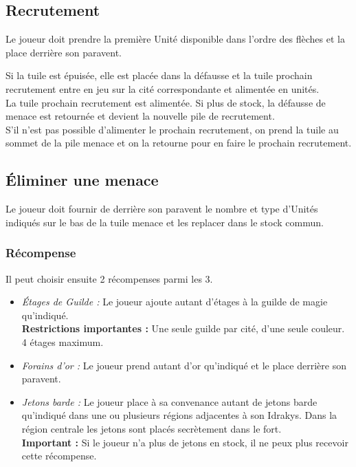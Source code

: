 \documentclass[10pt, a4paper]{article}	%
\begin{document}
\begin{multicols}{3}
\subsection{Recrutement} %
\label{sub:recrutement}
Le joueur doit prendre la première Unité disponible dans l'ordre des flèches et la place derrière son paravent.

Si la tuile est épuisée, elle est placée dans la défausse et la tuile \og{}prochain recrutement\fg{} entre en jeu sur la cité correspondante et alimentée en unités.\\
La tuile \og{}prochain recrutement\fg{} est alimentée. Si plus de stock, la défausse de menace est retournée et devient la nouvelle pile de recrutement.\\
S'il n'est pas possible d'alimenter le prochain recrutement, on prend la tuile au sommet de la pile menace et on la retourne pour en faire le prochain recrutement.

\subsection{Éliminer une menace} %
\label{sub:eliminer_une_menace}
Le joueur doit fournir de derrière son paravent le nombre et type d'Unités indiqués sur le bas de la tuile menace et les replacer dans le stock commun.

\subsubsection{Récompense} %
\label{ssub:recompense}
Il peut choisir ensuite 2 récompenses parmi les 3.
\begin{itemize}
    \item \emph{Étages de Guilde :} Le joueur ajoute autant d'étages à la guilde de magie qu'indiqué.\\
    \textbf{Restrictions importantes :} Une seule guilde par cité, d'une seule couleur. 4 étages maximum.
    \item \emph{Forains d'or :} Le joueur prend autant d'or qu'indiqué et le place derrière son paravent.
    \item \emph{Jetons barde :} Le joueur place à sa convenance autant de jetons barde qu'indiqué dans une ou plusieurs régions adjacentes à son Idrakys. Dans la région centrale les jetons sont placés secrètement dans le fort.\\
    \textbf{Important :} Si le joueur n'a plus de jetons en stock, il ne peux plus recevoir cette récompense.
\end{itemize}


\end{multicols}
\end{document}
